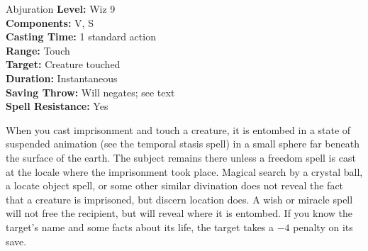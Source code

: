 {Abjuration}
{
	\textbf{Level:}
	Wiz 9\\
	\textbf{Components:}
	V, S\\
	\textbf{Casting Time:}
	1 standard action\\
	\textbf{Range:}
	Touch\\
	\textbf{Target:}
	Creature touched\\
	\textbf{Duration:}
	Instantaneous\\
	\textbf{Saving Throw:}
	Will negates; see text\\
	\textbf{Spell Resistance:}
	Yes\\
}
{
	When you cast imprisonment and touch a creature, it is entombed in a state of suspended animation (see the temporal stasis spell) in a small sphere far beneath the surface of the earth. The subject remains there unless a freedom spell is cast at the locale where the imprisonment took place. Magical search by a crystal ball, a locate object spell, or some other similar divination does not reveal the fact that a creature is imprisoned, but discern location does. A wish or miracle spell will not free the recipient, but will reveal where it is entombed. If you know the target's name and some facts about its life, the target takes a $-4$ penalty on its save.

}
